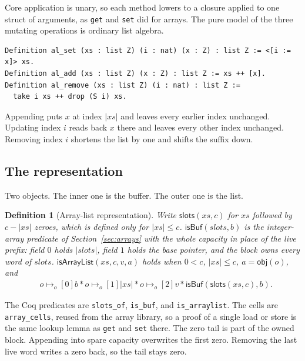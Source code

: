 \documentclass[11pt]{article}
\newtheorem{definition}[theorem]{Definition}
\newcommand{\ptso}{\mathrel{\mapsto_{o}}}
\newcommand{\sep}{\mathbin{*}}
\begin{document}
Core application is unary, so each method lowers to a closure applied to one struct of arguments, as \texttt{get} and \texttt{set} did for arrays.
The pure model of the three mutating operations is ordinary list algebra.

\begin{lstlisting}
Definition al_set (xs : list Z) (i : nat) (x : Z) : list Z := <[i := x]> xs.
Definition al_add (xs : list Z) (x : Z) : list Z := xs ++ [x].
Definition al_remove (xs : list Z) (i : nat) : list Z :=
  take i xs ++ drop (S i) xs.
\end{lstlisting}

Appending puts \(x\) at index \(\lvert xs \rvert\) and leaves every earlier index unchanged.
Updating index \(i\) reads back \(x\) there and leaves every other index unchanged.
Removing index \(i\) shortens the list by one and shifts the suffix down.

\subsection{The representation}

Two objects.
The inner one is the buffer.
The outer one is the list.

\begin{definition}[Array-list representation]
Write \(\mathsf{slots}(xs, c)\) for \(xs\) followed by \(c - \lvert xs \rvert\) zeroes, which is defined only for \(\lvert xs \rvert \le c\).
\(\mathsf{isBuf}(\mathit{slots}, b)\) is the integer-array predicate of Section~\ref{sec:arrays} with the whole capacity in place of the live prefix: field \(0\) holds \(\lvert \mathit{slots} \rvert\), field \(1\) holds the base pointer, and the block owns every word of \(\mathit{slots}\).
\(\mathsf{isArrayList}(xs, c, v, a)\) holds when \(0 < c\), \(\lvert xs \rvert \le c\), \(a = \mathsf{obj}(o)\), and
\[
\begin{aligned}
&o \ptso[0] b
\sep
o \ptso[1] \lvert xs \rvert
\sep
o \ptso[2] v
\sep
\mathsf{isBuf}(\mathsf{slots}(xs, c), b).
\end{aligned}
\]
\end{definition}

The Coq predicates are \texttt{slots\_of}, \texttt{is\_buf}, and \texttt{is\_arraylist}.
The cells are \texttt{array\_cells}, reused from the array library, so a proof of a single load or store is the same lookup lemma as \texttt{get} and \texttt{set} there.
The zero tail is part of the owned block.
Appending into spare capacity overwrites the first zero.
Removing the last live word writes a zero back, so the tail stays zero.
\end{document}
